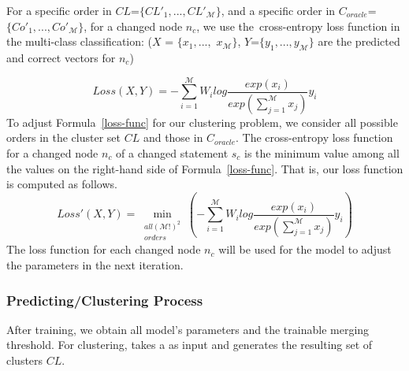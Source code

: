 For a specific order in $CL$=$\{CL'_1,..., CL'_{\mathcal{M}}\}$, and a
specific order in $C_{oracle}$=$\{Co'_{1},..., Co'_{\mathcal{M}}\}$,
for a changed node $n_c$, we use the~cross-entropy loss function in
the multi-class classification: ($X$ = $\{x_1,...,$ $x_{\mathcal{M}}\}$, $Y$=$\{y_1,...,y_{\mathcal{M}}\}$ are the predicted and correct
vectors for $n_c$)

\begin{equation}\label{loss-func}
	Loss(X,Y) = -\sum^{\mathcal{M}}_{i=1}W_ilog\frac{exp(x_i)}{exp(\sum^{\mathcal{M}}_{j=1}x_j)}y_i
\end{equation}
To adjust Formula~\ref{loss-func} for our clustering problem, we
consider all possible orders in the cluster set $CL$ and those in
$C_{oracle}$. The cross-entropy loss function for a changed node $n_c$
of a changed statement $s_c$ is the minimum value among all the values
on the right-hand side of Formula~\ref{loss-func}. That is, our loss function
is computed as follows.
\begin{equation}\label{eq6}
	Loss'(X, Y)= \min\limits_{\substack{all (\mathcal{M}!)^{2}\\orders}}(-\sum^{\mathcal{M}}_{i=1}W_ilog\frac{exp(x_i)}{exp(\sum^{\mathcal{M}}_{j=1}x_j)}y_i)
\end{equation}
The loss function for each changed node $n_c$ will be used for
the model to adjust the parameters in the next iteration.


\subsubsection{Predicting/Clustering Process}
After training, we obtain all model's parameters and the trainable
merging threshold. For clustering, {\tool} takes a {\mvpdg} as input
and generates the resulting set of clusters $CL$.
